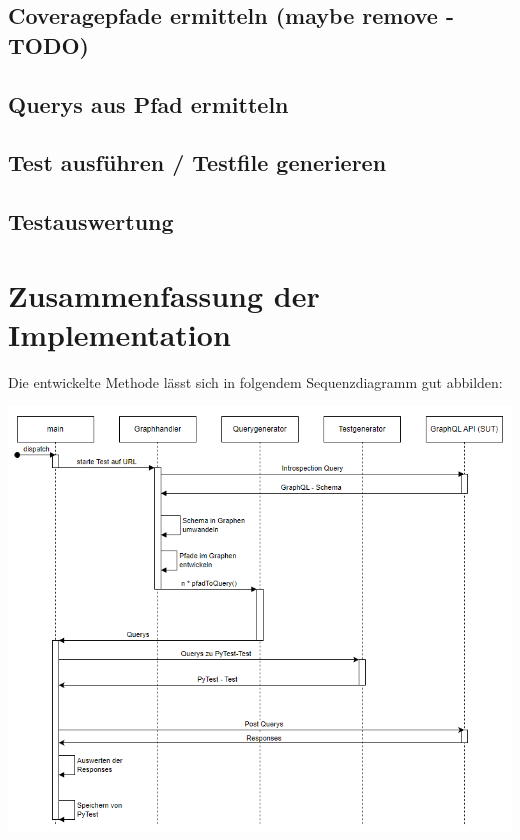\subsection{Coveragepfade ermitteln (maybe remove - TODO)}


\subsection{Querys aus Pfad ermitteln}
\subsection{Test ausführen / Testfile generieren}
\subsection{Testauswertung}

\newpage
\section{Zusammenfassung der Implementation}

Die entwickelte Methode lässt sich in folgendem Sequenzdiagramm gut abbilden:

\begin{center}
    \includegraphics[width=\textwidth,height=\textheight,keepaspectratio]{img/sequenz}
\end{center}





